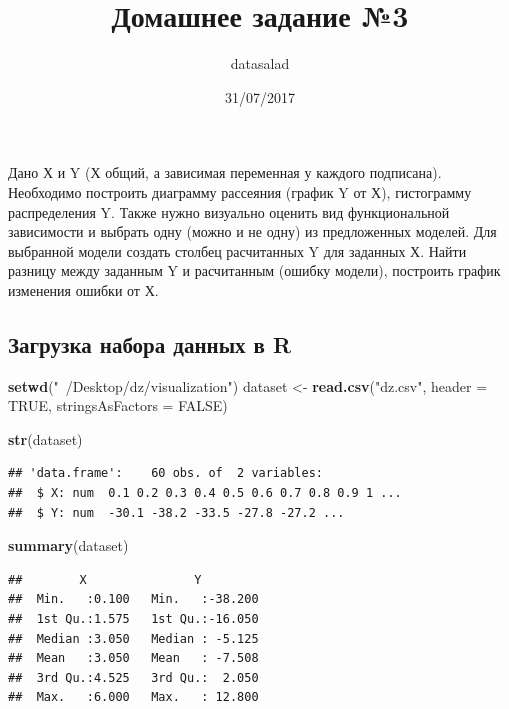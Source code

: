 \documentclass[]{article}
\title{Домашнее задание №3}
\author{datasalad}
\date{31/07/2017}
\newenvironment{Shaded}{\begin{snugshade}}{\end{snugshade}}
\newcommand{\KeywordTok}[1]{\textcolor[rgb]{0.13,0.29,0.53}{\textbf{{#1}}}}
\newcommand{\DataTypeTok}[1]{\textcolor[rgb]{0.13,0.29,0.53}{{#1}}}
\newcommand{\StringTok}[1]{\textcolor[rgb]{0.31,0.60,0.02}{{#1}}}
\newcommand{\OtherTok}[1]{\textcolor[rgb]{0.56,0.35,0.01}{{#1}}}
\newcommand{\NormalTok}[1]{{#1}}
\begin{document}
\maketitle

Дано Х и Y (Х общий, а зависимая переменная у каждого подписана).
Необходимо построить диаграмму рассеяния (график Y от Х), гистограмму
распределения Y. Также нужно визуально оценить вид функциональной
зависимости и выбрать одну (можно и не одну) из предложенных моделей.
Для выбранной модели создать столбец расчитанных Y для заданных Х. Найти
разницу между заданным Y и расчитанным (ошибку модели), построить график
изменения ошибки от Х.

\subsection{Загрузка набора данных в R}\label{----r}

\begin{Shaded}
\begin{Highlighting}[]
\KeywordTok{setwd}\NormalTok{(}\StringTok{"~/Desktop/dz/visualization"}\NormalTok{)}
\NormalTok{dataset <-}\StringTok{ }\KeywordTok{read.csv}\NormalTok{(}\StringTok{"dz.csv"}\NormalTok{, }\DataTypeTok{header =} \OtherTok{TRUE}\NormalTok{, }\DataTypeTok{stringsAsFactors =} \OtherTok{FALSE}\NormalTok{)}

\KeywordTok{str}\NormalTok{(dataset)}
\end{Highlighting}
\end{Shaded}

\begin{verbatim}
## 'data.frame':    60 obs. of  2 variables:
##  $ X: num  0.1 0.2 0.3 0.4 0.5 0.6 0.7 0.8 0.9 1 ...
##  $ Y: num  -30.1 -38.2 -33.5 -27.8 -27.2 ...
\end{verbatim}

\begin{Shaded}
\begin{Highlighting}[]
\KeywordTok{summary}\NormalTok{(dataset)}
\end{Highlighting}
\end{Shaded}

\begin{verbatim}
##        X               Y          
##  Min.   :0.100   Min.   :-38.200  
##  1st Qu.:1.575   1st Qu.:-16.050  
##  Median :3.050   Median : -5.125  
##  Mean   :3.050   Mean   : -7.508  
##  3rd Qu.:4.525   3rd Qu.:  2.050  
##  Max.   :6.000   Max.   : 12.800
\end{verbatim}
\end{document}
